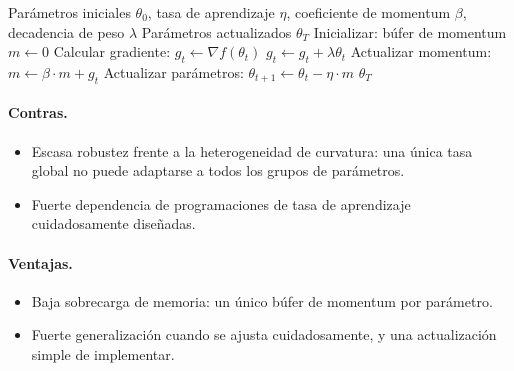 \begin{algorithm}[H]
\caption{SGD con Momentum}
\label{alg:sgd-momentum}
\begin{algorithmic}[1]
\Require Parámetros iniciales $\theta_0$, tasa de aprendizaje $\eta$, coeficiente de momentum $\beta$, decadencia de peso $\lambda$
\Ensure Parámetros actualizados $\theta_T$
\State Inicializar: búfer de momentum $m \gets 0$
    \State Calcular gradiente: $g_t \gets \nabla f(\theta_t)$
        \State $g_t \gets g_t + \lambda \theta_t$ 
    \EndIf
    \State Actualizar momentum: $m \gets \beta \cdot m + g_t$
    \State Actualizar parámetros: $\theta_{t+1} \gets \theta_t - \eta \cdot m$
\EndFor
\Return $\theta_T$
\end{algorithmic}
\end{algorithm}

\paragraph{Contras.}
\begin{itemize}[leftmargin=*]
\item Escasa robustez frente a la heterogeneidad de curvatura: una única tasa global no puede adaptarse a todos los grupos de parámetros.
\item Fuerte dependencia de programaciones de tasa de aprendizaje cuidadosamente diseñadas.
\end{itemize}

\paragraph{Ventajas.}
\begin{itemize}[leftmargin=*]
\item Baja sobrecarga de memoria: un único búfer de momentum por parámetro.
\item Fuerte generalización cuando se ajusta cuidadosamente, y una actualización simple de implementar.
\end{itemize}

